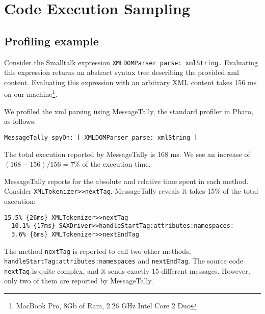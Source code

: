 \documentclass{sig-alternate}
\newcommand{\ct}{\lstinline[backgroundcolor=\color{white},basicstyle=\footnotesize\ttfamily]}
\newcommand{\ie}{\emph{i.e.,}\xspace}
\newcommand{\seclabel}[1]{\label{sec:#1}}
\begin{document}
\section{Code Execution Sampling} \seclabel{executionSampling}

\subsection{Profiling example}


Consider the Smalltalk expression \ct{XMLDOMParser parse: xmlString.} Evaluating this expression returns an abstract syntax tree describing the provided xml content. Evaluating this expression with an arbitrary XML content takes 156 ms on our machine\footnote{MacBook Pro, 8Gb of Ram, 2.26 GHz Intel Core 2 Duo}. 


We profiled the xml parsing using MessageTally, the standard profiler in Pharo, as follows:

\begin{lstlisting}
MessageTally spyOn: [ XMLDOMParser parse: xmlString ]
\end{lstlisting}

The total execution reported by MessageTally is 168 ms. We see an increase of $(168 - 156) / 156 = 7\%$ of the execution time. %

MessageTally reports for the absolute and relative time spent in each method. Consider \ct{XMLTokenizer>>nextTag}, MessageTally reveals it takes 15\% of the total execution:

\begin{lstlisting}
15.5% {26ms} XMLTokenizer>>nextTag
  10.1% {17ms} SAXDriver>>handleStartTag:attributes:namespaces:
  3.6% {6ms} XMLTokenizer>>nextEndTag
\end{lstlisting}

The method \ct{nextTag} is reported to call two other methods, \ct{handleStartTag:attributes:namespaces} and \ct{nextEndTag}. The source code \ct{nextTag} is quite complex, and it sends exactly 15 different messages. However, only two of them are reported by MessageTally.
\end{document}
